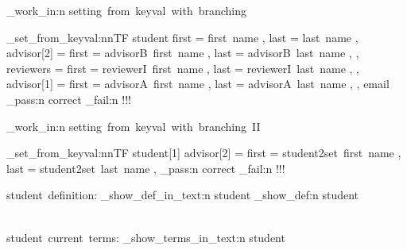 \documentclass{article}
\begin{document}
\sttests_work_in:n {setting~from~keyval~with~branching}

      \starray_set_from_keyval:nnTF
        {student}
        {
          first = first~name ,
          last = last~name ,
          advisor[2] = {
            first = advisorB~first~name ,
            last  = advisorB~last~name ,
          } ,
          reviewers = {
            first = reviewerI~first~name ,
            last  = reviewerI~last~name ,
          } ,
          advisor[1] = {
            first = advisorA~first~name ,
            last  = advisorA~last~name ,
          } ,
          email
        }
        {\sttests_pass:n {correct}}
        {\sttests_fail:n {!!!}}

\sttests_work_in:n {setting~from~keyval~with~branching~II}

      \starray_set_from_keyval:nnTF
        {student[1]}
        {
          advisor[2] = {
            first = student2set~first~name ,
            last  = student2set~last~name ,
            }
        }
        {\sttests_pass:n {correct}}
        {\sttests_fail:n {!!!}}

\par
student~definition:
\starray_show_def_in_text:n {student}
\starray_show_def:n {student}

\\[2\baselineskip]
student~current~terms:
\starray_show_terms_in_text:n {student}


\ExplSyntaxOff
\end{document}

